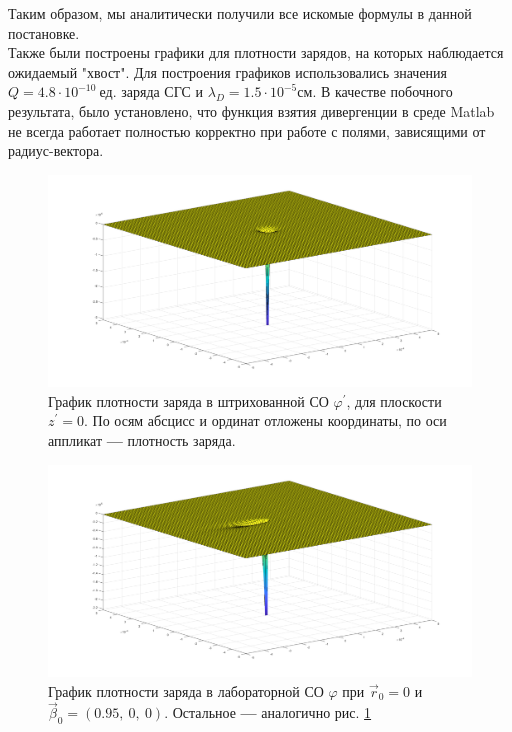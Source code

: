 \documentclass[oneside,final,14pt]{extarticle}
\begin{document}
	\noindent Таким образом, мы аналитически получили все искомые формулы в данной постановке. \\
	
	\noindent Также были построены графики для плотности зарядов, на которых наблюдается ожидаемый "хвост". Для построения графиков использовались значения $Q=4.8 \cdot 10^{-10} \ \text{ед. заряда СГС}$ и $\lambda_{D}=1.5\cdot 10^{-5} \text{см}$. В качестве побочного результата, было установлено, что функция взятия дивергенции в среде Matlab не всегда работает полностью корректно при работе с полями, зависящими от радиус-вектора.  
	
	\begin{figure}
		\centering
		\includegraphics[scale=0.36]{spd0orig.png}
		\caption{График плотности заряда в штрихованной СО $\varphi^{\prime}$, для плоскости $z^{\prime}=0$. По осям абсцисс и ординат отложены координаты, по оси аппликат \textbf{---} плотность заряда.}
		\label{ris:rho0}
	\end{figure}
	
	\begin{figure}
		\centering
		\includegraphics[scale=0.36]{spd095orig.png}
		\caption{График плотности заряда в лабораторной СО $\varphi$ при $\vec r_{0}=0$ и $\vec \beta_0 = (0.95, \ 0, \ 0)$. Остальное \textbf{---} аналогично рис. \ref{ris:rho0}}
		\label{ris:rho095}
	\end{figure}
	
\end{document}
